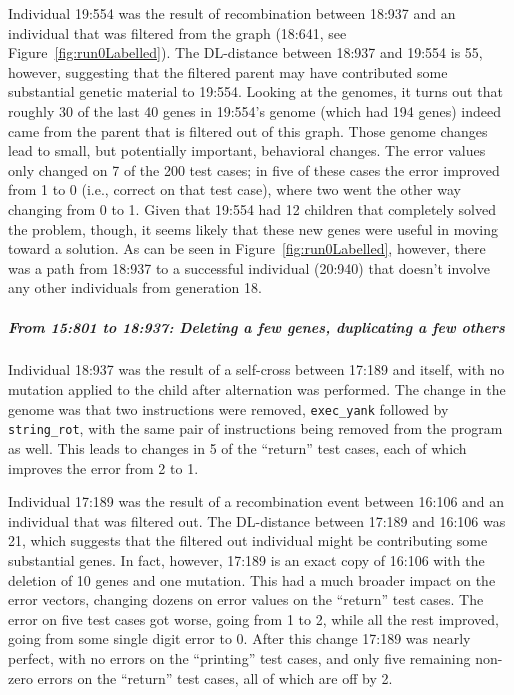 Individual 19:554 was the result of 
recombination between 18:937 and an individual that was filtered from the
graph (18:641, see Figure~\ref{fig:run0Labelled}). 
The DL-distance between 18:937 and 19:554 is 55, however,
suggesting that the filtered parent may have contributed some substantial
genetic material to 19:554. Looking at the genomes, it turns out that 
roughly 30 of the last 40 genes in 19:554's genome (which had 194 genes) 
indeed came from the parent that is filtered out of this graph. Those genome
changes lead to small, but potentially important, behavioral changes. 
The error values only 
changed on 7 of the 200 test cases; in five of these cases the error improved
from 1 to 0 (i.e., correct on that test case), where two went the other way
changing from 0 to 1. Given that 19:554 had 12 children that completely
solved the problem, though, it seems likely that these new genes were useful
in moving toward a solution. As can be seen in Figure~\ref{fig:run0Labelled},
however, there was a path from 18:937 to a successful individual (20:940)
that doesn't involve any other individuals from generation 18.

\subparagraph{From 15:801 to 18:937: Deleting a few genes, duplicating a few others}

Individual 18:937 was the result of a self-cross between 17:189 and itself,
with no mutation applied to the child after alternation was performed. The
change in the genome was that two instructions were removed, 
\texttt{exec\_yank} followed by \texttt{string\_rot}, with the same pair of
instructions being removed from the program as well. This leads to changes
in 5 of the ``return'' test cases, each of which improves the error 
from 2 to 1.

Individual 17:189 was the result of a recombination event between 16:106
and an individual that was filtered out. The DL-distance between 17:189
and 16:106 was 21, which suggests that the filtered out individual might
be contributing some substantial genes. In fact, however, 17:189 is an
exact copy of 16:106 with the deletion of 10 genes and one mutation. This
had a much broader impact on the error vectors, changing dozens on error
values on the ``return'' test cases. The error on five test cases got worse,
going from 1 to 2, while all the rest improved, going from some single
digit error to 0. After this change 17:189 was nearly perfect, with no errors
on the ``printing'' test cases, and only five remaining non-zero errors on
the ``return'' test cases, all of which are off by 2.

